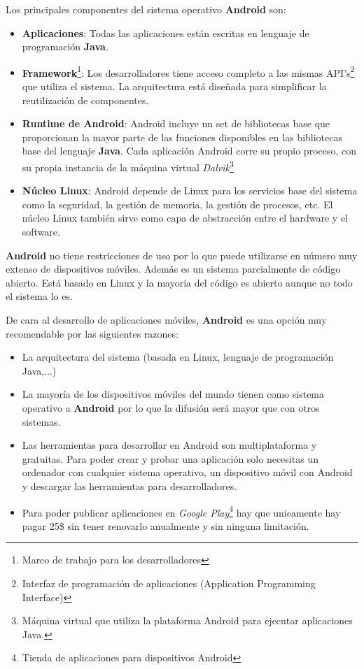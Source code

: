 \bigskip
Los principales componentes del sistema operativo \textbf{Android} son:


\begin{itemize}
  \item \textbf{Aplicaciones}: Todas las aplicaciones están escritas en lenguaje de programación \textbf{Java}.
  \item \textbf{Framework}\footnote{Marco de trabajo para los desarrolladores}: Los desarrolladores tiene acceso completo a las mismas API's\footnote{Interfaz de programación de aplicaciones (Application Programming Interface)} que utiliza el sistema. La arquitectura está diseñada para simplificar la reutilización de componentes.
  \item \textbf{Runtime de Android}: Android incluye un set de bibliotecas base que proporcionan la mayor parte de las funciones disponibles en las bibliotecas base del lenguaje \textbf{Java}. Cada aplicación Android corre su propio proceso, con su propia instancia de la máquina virtual \textit{Dalvik}\footnote{Máquina virtual que utiliza la plataforma Android para ejecutar aplicaciones Java.}
  \item \textbf{Núcleo Linux}: Android depende de Linux para los servicios base del sistema como la seguridad, la gestión de memoria, la gestión de procesos, etc. El núcleo Linux también sirve como capa de abstracción entre el hardware y el software.
\end{itemize}

\bigskip
\textbf{Android} no tiene restricciones de uso por lo que puede utilizarse en número muy extenso de dispositivos móviles. Además es un sistema parcialmente de código abierto. Está basado en Linux y la mayoría del código es abierto aunque no todo el sistema lo es.

\bigskip
De cara al desarrollo de aplicaciones móviles, \textbf{Android} es una opción muy recomendable por las siguientes razones:

\begin{itemize}
  \item La arquitectura del sistema (basada en Linux, lenguaje de programación Java,...)
  \item La mayoría de los dispositivos móviles del mundo tienen como sistema operativo a \textbf{Android} por lo que la difusión será mayor que con otros sistemas.
  \item Las herramientas para desarrollar en Android son multiplataforma y gratuitas. Para poder crear y probar una aplicación solo necesitas un ordenador con cualquier sistema operativo, un dispositivo móvil con Android y descargar las herramientas para desarrolladores.
  \item Para poder publicar aplicaciones en \textit{Google Play}\footnote{Tienda de aplicaciones para dispositivos Android} hay que unicamente hay pagar 25\$ sin tener renovarlo anualmente y sin ninguna limitación.
\end{itemize}